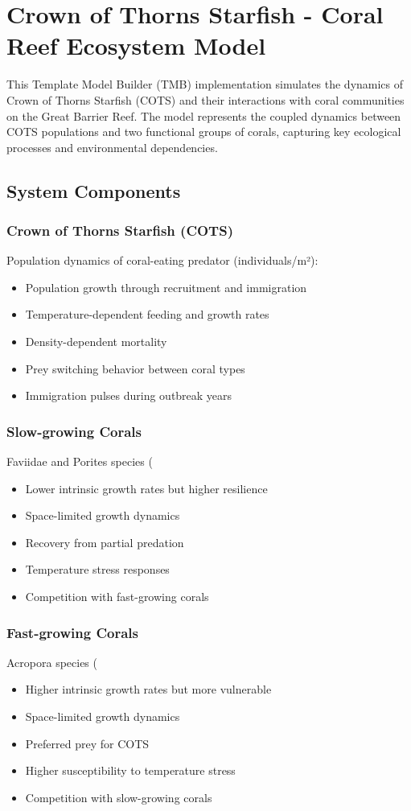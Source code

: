 \documentclass{article}
\begin{document}
\section{Crown of Thorns Starfish - Coral Reef Ecosystem Model}

This Template Model Builder (TMB) implementation simulates the dynamics of Crown of Thorns Starfish (COTS) and their interactions with coral communities on the Great Barrier Reef. The model represents the coupled dynamics between COTS populations and two functional groups of corals, capturing key ecological processes and environmental dependencies.

\subsection{System Components}

\subsubsection{Crown of Thorns Starfish (COTS)}
Population dynamics of coral-eating predator (individuals/m²):
\begin{itemize}
\item Population growth through recruitment and immigration
\item Temperature-dependent feeding and growth rates
\item Density-dependent mortality
\item Prey switching behavior between coral types
\item Immigration pulses during outbreak years
\end{itemize}

\subsubsection{Slow-growing Corals}
Faviidae and Porites species (%
\begin{itemize}
\item Lower intrinsic growth rates but higher resilience
\item Space-limited growth dynamics
\item Recovery from partial predation
\item Temperature stress responses
\item Competition with fast-growing corals
\end{itemize}

\subsubsection{Fast-growing Corals}
Acropora species (%
\begin{itemize}
\item Higher intrinsic growth rates but more vulnerable
\item Space-limited growth dynamics
\item Preferred prey for COTS
\item Higher susceptibility to temperature stress
\item Competition with slow-growing corals
\end{itemize}
\end{document}
